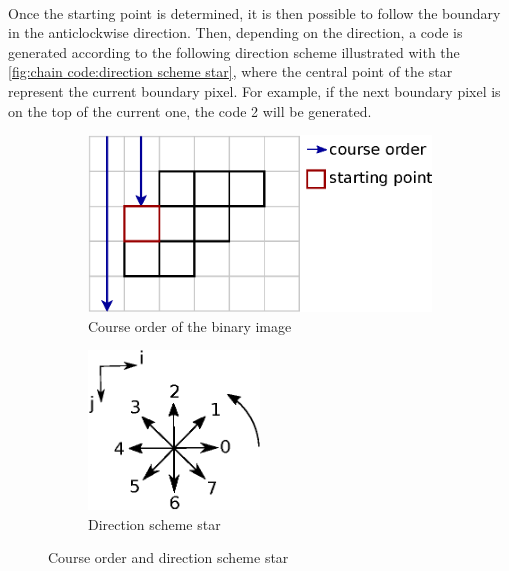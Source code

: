 ~~


Once the starting point is determined, it is then possible to follow the boundary in the anticlockwise direction. Then, depending on the direction, a code is generated according to the following direction scheme illustrated with the \vref{fig:chain code:direction scheme star}, where the central point of the star represent the current boundary pixel. For example, if the next boundary pixel is on the top of the current one, the code 2 will be generated. 


\begin{figure}[H]
	\centering
	
  	\begin{subfigure}[b]{0.5\textwidth}
    	\includegraphics[width=\textwidth]{images/chain_code/course_order}
		\caption{Course order of the binary image \cite{bib:chain:ParametreGeometriqueChaineFreeman}}
		\label{fig:chain code:course order}	
  	\end{subfigure}
  	\begin{subfigure}[b]{0.4\textwidth}
  		\centering
    	\includegraphics[width=0.5\textwidth]{images/chain_code/direction_scheme_star}
    	\caption{Direction scheme star \cite{bib:chain:ParametreGeometriqueChaineFreeman}}
		\label{fig:chain code:direction scheme star}
  	\end{subfigure}
	
	\caption{Course order and direction scheme star}
\end{figure}




